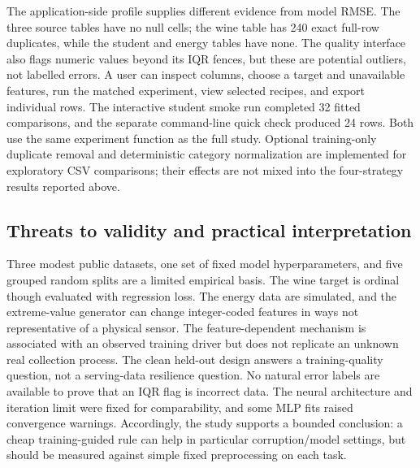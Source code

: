 \documentclass[conference]{IEEEtran}
\begin{document}
The application-side profile supplies different evidence from model RMSE. The three source tables have no null cells; the wine table has 240 exact full-row duplicates, while the student and energy tables have none. The quality interface also flags numeric values beyond its IQR fences, but these are potential outliers, not labelled errors. A user can inspect columns, choose a target and unavailable features, run the matched experiment, view selected recipes, and export individual rows. The interactive student smoke run completed 32 fitted comparisons, and the separate command-line quick check produced 24 rows. Both use the same experiment function as the full study. Optional training-only duplicate removal and deterministic category normalization are implemented for exploratory CSV comparisons; their effects are not mixed into the four-strategy results reported above.

\subsection{Threats to validity and practical interpretation}
Three modest public datasets, one set of fixed model hyperparameters, and five grouped random splits are a limited empirical basis. The wine target is ordinal though evaluated with regression loss. The energy data are simulated, and the extreme-value generator can change integer-coded features in ways not representative of a physical sensor. The feature-dependent mechanism is associated with an observed training driver but does not replicate an unknown real collection process. The clean held-out design answers a training-quality question, not a serving-data resilience question. No natural error labels are available to prove that an IQR flag is incorrect data. The neural architecture and iteration limit were fixed for comparability, and some MLP fits raised convergence warnings. Accordingly, the study supports a bounded conclusion: a cheap training-guided rule can help in particular corruption/model settings, but should be measured against simple fixed preprocessing on each task.
\end{document}

